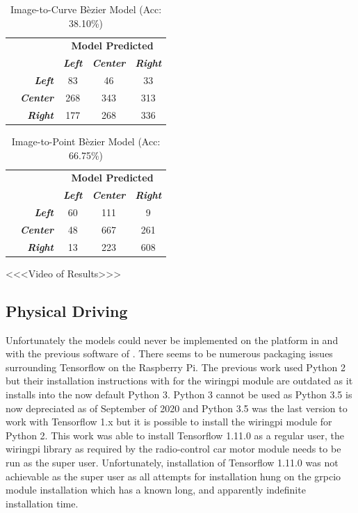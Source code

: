 \documentclass[conference]{IEEEtran}
\begin{document}
\begin{table}[btp]
	\centering
	\caption{Image-to-Curve B\`ezier Model (Acc: 38.10\%) }
	\begin{tabular}{|c|r|c|c|c|}
		\multicolumn{2}{c}{} & \multicolumn{3}{c}{\bfseries Model Predicted}\\\cline{3-5}
		\multicolumn{1}{c}{} & & \textbf{\textit{Left}} & \textbf{\textit{Center}} & \textbf{\textit{Right}}\\\hline
		\parbox[t]{2mm}{} & \textbf{\textit{Left}} & 83 & 46 & 33 \\
		& \textbf{\textit{Center}} & 268 & 343 & 313 \\
		& \textbf{\textit{Right}} & 177 & 268 & 336 \\\hline
	\end{tabular}
	\label{tab:i2bc-acc}
\end{table}

\begin{table}[btp]
	\centering
	\caption{Image-to-Point B\`ezier Model (Acc: 66.75\%)}
	\begin{tabular}{|c|r|c|c|c|}
		\multicolumn{2}{c}{} & \multicolumn{3}{c}{\bfseries Model Predicted}\\\cline{3-5}
		\multicolumn{1}{c}{} & & \textbf{\textit{Left}} & \textbf{\textit{Center}} & \textbf{\textit{Right}}\\\hline
		\parbox[t]{2mm}{} & \textbf{\textit{Left}} & 60 & 111 & 9 \\
		& \textbf{\textit{Center}} & 48 & 667 & 261 \\
		& \textbf{\textit{Right}} & 13 & 223 & 608 \\\hline
	\end{tabular}
	\label{tab:i2bp-acc}
\end{table}

<<<Video of Results>>>

\subsection{Physical Driving}

Unfortunately the models could never be implemented on the platform in and with the previous software of \cite{bechtel2018}. There seems to be numerous packaging issues surrounding Tensorflow on the Raspberry Pi. The previous work used Python 2 but their installation instructions with for the wiringpi module are outdated as it installs into the now default Python 3. Python 3 cannot be used as Python 3.5 is now depreciated as of September of 2020 and Python 3.5 was the last version to work with Tensorflow 1.x but it is possible to install the wiringpi module for Python 2. This work was able to install Tensorflow 1.11.0 as a regular user, the wiringpi library as required by the radio-control car motor module needs to be run as the super user. Unfortunately, installation of Tensorflow 1.11.0 was not achievable as the super user as all attempts for installation hung on the grpcio module installation which has a known long, and apparently indefinite installation time.
\end{document}
